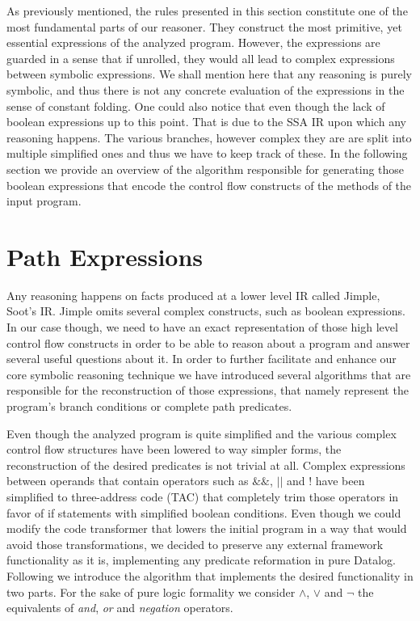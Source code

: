 As previously mentioned, the rules presented in this section constitute
one of the most fundamental parts of our reasoner. They construct the
most primitive, yet essential expressions of the analyzed program. However,
the expressions are guarded in a sense that if unrolled, they would all
lead to complex expressions between symbolic expressions. We shall mention
here that any reasoning is purely symbolic, and thus there is not any concrete
evaluation of the expressions in the sense of constant folding. One could also
notice that even though the lack of boolean expressions up to this point. That
is due to the SSA IR upon which any reasoning happens. The various branches,
however complex they are are split into multiple simplified ones and thus we
have to keep track of these. In the following section we provide an overview of
the algorithm responsible for generating those boolean expressions that encode
the control flow constructs of the methods of the input program.

\section{Path Expressions}\label{s:paths}

Any \doop{} reasoning happens on facts produced at a lower level IR
called Jimple, Soot's IR. Jimple omits several complex constructs,
such as boolean expressions. In our case though, we need to have an exact
representation of those high level control flow constructs in order to be
able to reason about a program and answer several useful questions about
it. In order to further facilitate and enhance our core symbolic reasoning
technique we have introduced several algorithms that are responsible for the
reconstruction of those expressions, that namely represent the program's branch
conditions or complete path predicates.


Even though the analyzed program is quite simplified and the various complex
control flow structures have been lowered to way simpler forms, the reconstruction
of the desired predicates is not trivial at all. Complex expressions between operands
that contain operators such as $\&\&$, $||$ and $!$ have been simplified
to three-address code (TAC) that completely trim those operators in favor of
if statements with simplified boolean conditions. Even though we could modify
the code transformer that lowers the initial program in a way that would avoid those
transformations, we decided to preserve any external framework functionality as
it is, implementing any predicate reformation in pure Datalog. Following
we introduce the algorithm that implements the desired functionality in two parts.
For the sake of pure logic formality we consider $\land$, $\lor$ and $\neg$ the equivalents of
\emph{and}, \emph{or} and \emph{negation} operators.

